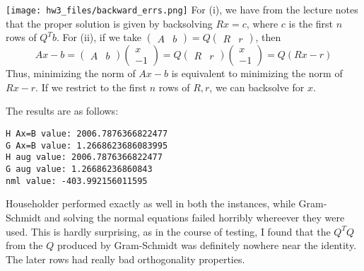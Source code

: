 \documentclass{article}
\newcommand{\openm}{\begin{pmatrix}}
\newcommand{\closem}{\end{pmatrix}}
\begin{document}
\texttt{[image: hw3\_files/backward\_errs.png]}
For (i), we have from the lecture notes that the proper solution is given by backsolving $Rx=c$, where $c$ is the first $n$ rows of $Q^Tb$. For (ii), if we take $\openm A&b\closem=Q\openm R&r\closem$, then 
\[Ax-b=\openm A&b\closem\openm x\\-1\closem=Q\openm R&r\closem\openm x\\-1\closem=Q(Rx-r)\]
Thus, minimizing the norm of $Ax-b$ is equivalent to minimizing the norm of $Rx-r$. If we restrict to the first $n$ rows of $R, r$, we can backsolve for $x$.

The results are as follows:
\begin{verbatim}
H Ax=B value: 2006.7876366822477
G Ax=B value: 1.2668623686083995
H aug value: 2006.7876366822477
G aug value: 1.26686236860843
nml value: -403.992156011595
\end{verbatim}
Householder performed exactly as well in both the instances, while Gram-Schmidt and solving the normal equations failed horribly whereever they were used. This is hardly surprising, as in the course of testing, I found that the $Q^TQ$ from the $Q$ produced by Gram-Schmidt was definitely nowhere near the identity. The later rows had really bad orthogonality properties.
\end{document}
